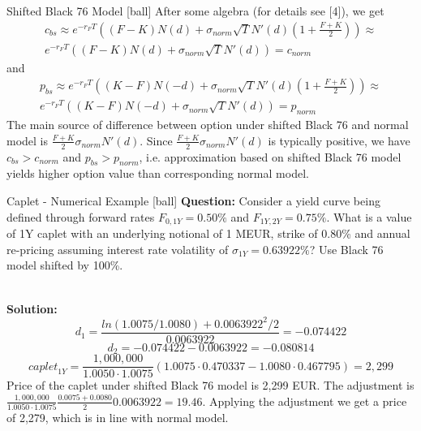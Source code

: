 \documentclass{beamer}
\begin{document}
\begin{frame}{Shifted Black 76 Model}
[ball]
After some algebra (for details see [4]), we get
\begin{multline}
c_{bs} \approx e^{-r_F T}\left((F - K)N(d) + \sigma_{norm}\sqrt{T}N'(d) \left(1 + \frac{F + K}{2} \right)\right) \approx\\
e^{-r_F T}\left((F - K)N(d) + \sigma_{norm} \sqrt{T} N'(d) \right) = c_{norm}
\end{multline}
and
\begin{multline}
p_{bs} \approx e^{-r_F T}\left((K - F)N(-d) + \sigma_{norm}\sqrt{T}N'(d) \left(1 + \frac{F + K}{2} \right)\right) \approx\\
e^{-r_F T}\left((K - F)N(-d) + \sigma_{norm} \sqrt{T} N'(d) \right) = p_{norm}
\end{multline}
The main source of difference between option under shifted Black 76 and normal model is $\frac{F + K}{2} \sigma_{norm}N'(d)$. Since $\frac{F + K}{2} \sigma_{norm}N'(d)$ is typically positive, we have $c_{bs} > c_{norm}$ and $p_{bs} > p_{norm}$, i.e. approximation based on shifted Black 76 model yields higher option value than corresponding normal model.
\end{frame}

\begin{frame}{Caplet - Numerical Example}
[ball]
\textbf{Question:}
Consider a yield curve being defined through forward rates $F_{0, 1Y} = 0.50\%$ and $F_{1Y, 2Y} = 0.75\%$. What is a value of 1Y caplet with an underlying notional of 1 MEUR, strike of 0.80\% and annual re-pricing assuming interest rate volatility of $\sigma_{1Y} = 0.63922\%$? Use Black 76 model shifted by 100\%.

\mbox{}\\
\textbf{Solution:}
\begin{equation}
d_1 = \frac{ln(1.0075 / 1.0080) + 0.0063922^2 / 2}{0.0063922} = -0.074422
\end{equation}
\begin{equation}
d_2 = -0.074422 - 0.0063922 = -0.080814
\end{equation}
\begin{equation}
\textit{caplet}_{1Y} = \frac{1,000,000}{1.0050 \cdot 1.0075}\left(1.0075 \cdot 0.470337 - 1.0080 \cdot 0.467795 \right) = 2,299
\end{equation}
Price of the caplet under shifted Black 76 model is 2,299 EUR. The adjustment is $\frac{1,000,000}{1.0050 \cdot 1.0075}\frac{0.0075 + 0.0080}{2}0.0063922 = 19.46$. Applying the adjustment we get a price of 2,279, which is in line with normal model.
\end{frame}
\end{document}
